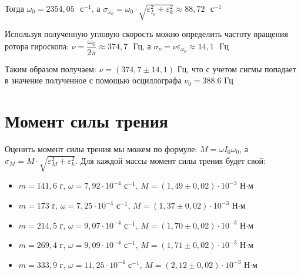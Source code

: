 \documentclass[a4paper, 12pt]{article}
\begin{document}
	Тогда $\omega_0 = 2354,05\text{ }\text{с}^{-1}$, а $\sigma_{\omega_0} = \omega_0\cdot\sqrt{\varepsilon_{I_0}^2+ \varepsilon_k^2} \approx 88,72\text{ }\text{с}^{-1}$
	
	Используя полученную угловую скорость можно определить частоту вращения ротора гироскопа: $\nu = \dfrac{\omega_0}{2\pi} \approx 374,7\text{ }\text{Гц}$, а $\sigma_{\nu} = \nu\varepsilon_{\omega_0} \approx 14,1\text{ }\text{Гц}$
	
	Таким образом получаем: \underline{$\nu = (374,7\pm14,1)\text{ Гц}$}, что с учетом сигмы попадает в значение полученное с помощью осциллографа $\nu_0 = 388.6\text{ Гц}$

 \section{Момент силы трения}
	
	Оценить момент силы трения мы можем по формуле: $M = \omega I_0 \omega_0$, а $\sigma_M = M\cdot\sqrt{\varepsilon_M^2+ \varepsilon_k^2}$. Для каждой массы момент силы трения будет свой:
	
	\begin{itemize}
		\item $m = 141,6$ г, $\omega = 7,92\cdot 10^{-4}$ $\text{с}^{-1}$, $M = (1,49\pm0,02)\cdot10^{-3}$ Н$\cdot$м
		\item $m = 173$ г, $\omega = 7,25\cdot 10^{-4}$ $\text{с}^{-1}$, $M = (1,37\pm0,02)\cdot10^{-3}$ Н$\cdot$м
		\item $m = 214,5$ г, $\omega = 9,07\cdot 10^{-4}$ $\text{с}^{-1}$, $M = (1,70\pm0,02)\cdot10^{-3}$ Н$\cdot$м
		\item $m = 269,4$ г, $\omega = 9,09\cdot 10^{-4}$ $\text{с}^{-1}$, $M = (1,71\pm 0,02)\cdot10^{-3}$ Н$\cdot$м
		\item $m = 333,9$ г, $\omega = 11,25\cdot 10^{-4}$ $\text{с}^{-1}$, $M = (2,12 \pm 0,02)\cdot10^{-3}$ Н$\cdot$м
	\end{itemize}  
\end{document}
